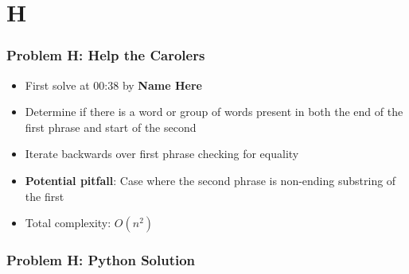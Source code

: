 \section{H}%
\label{sec:h}

\begin{frame}
  \frametitle{Problem H: Help the Carolers}

  \begin{itemize}
    \item First solve at 00:38 by \textbf{Name Here}
    \item Determine if there is a word or group of words present in both the end of the first phrase and start of the second
    \item Iterate backwards over first phrase checking for equality
    \item \textbf{Potential pitfall}: Case where the second phrase is non-ending substring of the first
    \item Total complexity: $O(n^2)$
  \end{itemize}
\end{frame}

\begin{frame}
  \frametitle{Problem H: Python Solution}
\end{frame}
